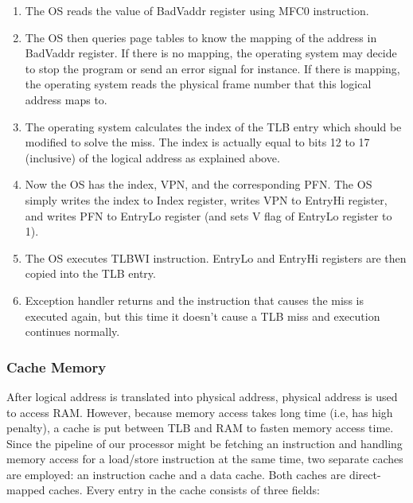 \documentclass[]{scrartcl}
\begin{document}
\begin{enumerate}

\item The OS reads the value of BadVaddr register using MFC0 instruction.

\item The OS then queries page tables to know the mapping of the address
      in BadVaddr register. If there is no mapping, the operating system
      may decide to stop the program or send an error signal for instance.
      If there is mapping, the operating system reads the physical
      frame number that this logical address maps to.

\item The operating system calculates the index of the TLB entry which
      should be modified to solve the miss. The index is actually
      equal to bits 12 to 17 (inclusive) of the logical address as
      explained above.

\item Now the OS has the index, VPN, and the corresponding PFN. The OS
      simply writes the index to Index register, writes VPN to EntryHi
      register, and writes PFN to EntryLo register (and sets V flag 
      of EntryLo register to 1).

\item The OS executes TLBWI instruction. EntryLo and EntryHi registers
      are then copied into the TLB entry.
      
\item Exception handler returns and the instruction that causes the miss
      is executed again, but this time it doesn't cause a TLB miss and
      execution continues normally.

\end{enumerate}

\subsubsection{Cache Memory}

After logical address is translated into physical address, physical
address is used to access RAM. However, because memory access
takes long time (i.e, has high penalty), a cache is put
between TLB and RAM to fasten memory access time.\\

Since the pipeline of our processor might be fetching an instruction
and handling memory access for a load/store instruction at the same time,
two separate caches are employed: an instruction cache and a data cache.
Both caches are direct-mapped caches. Every entry in the cache consists of
three fields:
\end{document}
